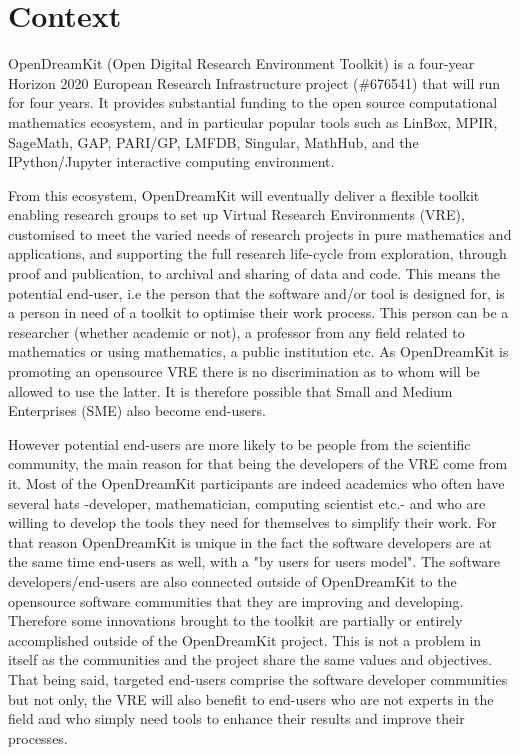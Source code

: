 \documentclass{deliverablereport}
\author{Benoît Pilorget et al.}
\begin{document}
\enlargethispage{4ex}
\maketitle
\githubissuedescription
\tableofcontents\newpage


\section{Context}

OpenDreamKit (Open Digital Research Environment Toolkit) is a four-year Horizon 2020 European Research Infrastructure project (\#676541) that will run for four years. It provides substantial funding to the open source computational mathematics ecosystem, and in particular popular tools such as LinBox, MPIR, SageMath, GAP, PARI/GP, LMFDB, Singular, MathHub, and the IPython/Jupyter interactive computing environment.

From this ecosystem, OpenDreamKit will eventually deliver a flexible toolkit enabling research groups to set up Virtual Research Environments (VRE), customised to meet the varied needs of research projects in pure mathematics and applications, and supporting the full research life-cycle from exploration, through proof and publication, to archival and sharing of data and code. 
This means the potential end-user, i.e the person that the software and/or tool is designed for, is a person in need of a toolkit to optimise their work process. This person can be a researcher (whether academic or not), a professor from any field related to mathematics or using mathematics, a public institution etc. As OpenDreamKit is promoting an opensource VRE there is no discrimination as to whom will be allowed to use the latter. It is therefore possible that Small and Medium Enterprises (SME) also become end-users.

However potential end-users are more likely to be people from the scientific community, the main reason for that being the developers of the VRE come from it. Most of the OpenDreamKit participants are indeed academics who often have several hats -developer, mathematician, computing scientist etc.- and who are willing to develop the tools they need for themselves to simplify their work. For that reason OpenDreamKit is unique in the fact the software developers are at the same time end-users as well, with a "by users for users model". The software developers/end-users are also connected outside of OpenDreamKit to the opensource software communities that they are improving and developing. Therefore some innovations brought to the toolkit are partially or entirely accomplished outside of the OpenDreamKit project. This is not a problem in itself as the communities and the project share the same values and objectives.
That being said, targeted end-users comprise the software developer communities but not only, the VRE will also benefit to end-users who are not experts in the field and who simply need tools to enhance their results and improve their processes.
\end{document}
